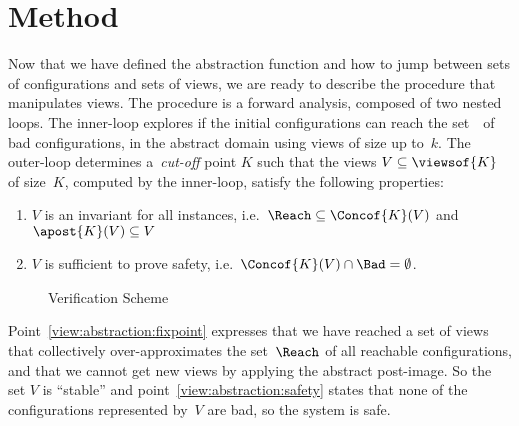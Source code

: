 \section{Method}
\label{section:view:method}

Now that we have defined the abstraction function and how to jump
between sets of configurations and sets of views, we are ready to
describe the procedure that manipulates views.
%
%
The procedure is a forward analysis, composed of two nested loops.
%
The inner-loop explores if the initial configurations can reach the
set~\Bad\ of bad configurations, in the abstract domain using views of
size up to~$k$.
%
%
The outer-loop determines a~\emph{\mbox{cut-off}} point $K$ such that
the views $V\subseteq\viewsof{K}$ of size~$K$, computed by the
inner-loop, satisfy the following properties:
%
\begin{enumerate}[label=(\roman*)]
\item {}%
  \label{view:abstraction:fixpoint}$V$ is an invariant for all instances, %
  i.e.\ $\Reach\subseteq\Concof{K}(V)$ and $\apost{K}(V)\subseteq{V}$
\item {}%
  \label{view:abstraction:safety}$V$ is sufficient to prove safety, %
  i.e.\ $\Concof{K}(V) \cap \Bad = \emptyset$.
\end{enumerate}
%
%

\noindent%
\begin{wrapfigure}{r}[0pt]{0.55\linewidth}
  \begin{algorithm}[H]
    \DontPrintSemicolon
    \caption{Verification Scheme}
    \label{algo:view:scheme}
  \end{algorithm}
\end{wrapfigure}
%
Point~\ref{view:abstraction:fixpoint} expresses that we have reached a
set of views that collectively over-approximates the set~$\Reach$ of
all reachable configurations, and that we cannot get new views by
applying the abstract post-image. So the set $V$ is ``stable'' and
point~\ref{view:abstraction:safety} states that none of the
configurations represented by~$V$ are bad, so the system is safe.
%
%

